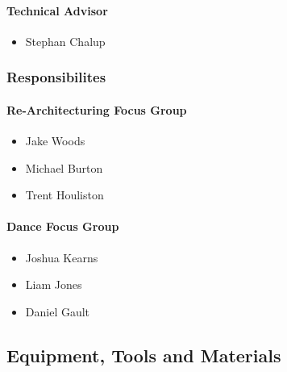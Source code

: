 \documentclass[a4paper]{article}
\begin{document}
				\paragraph{Technical Advisor}
					\begin{itemize}
						\item Stephan Chalup
					\end{itemize}
			\subsubsection{Responsibilites}
				\paragraph{Re-Architecturing Focus Group}
					\begin{itemize}
						\item Jake Woods
						\item Michael Burton
						\item Trent Houliston
					\end{itemize}
				\paragraph{Dance Focus Group}
					\begin{itemize}
						\item Joshua Kearns
						\item Liam Jones
						\item Daniel Gault
					\end{itemize}
		\subsection{Equipment, Tools and Materials}
\end{document}
